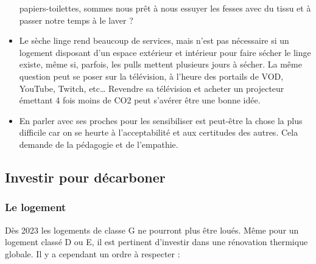 \begin{itemize}
  papiers-toilettes, sommes nous prêt à nous essuyer les fesses avec du
  tissu et à passer notre temps à le laver ?\\
\item
  Le sèche linge rend beaucoup de services, mais n'est pas nécessaire si
  un logement disposant d'un espace extérieur et intérieur pour faire
  sécher le linge existe, même si, parfois, les pulls mettent plusieurs
  jours à sécher. La même question peut se poser sur la télévision, à
  l'heure des portails de VOD, YouTube, Twitch, etc\ldots{} Revendre sa
  télévision et acheter un projecteur émettant 4 fois moins de CO2 peut
  s'avérer être une bonne idée.\\
\item
  En parler avec ses proches pour les sensibiliser est peut-être la
  chose la plus difficile car on se heurte à l'acceptabilité et aux
  certitudes des autres. Cela demande de la pédagogie et de l'empathie.
\end{itemize}

\hypertarget{investir-pour-duxe9carboner}{%
\subsection{Investir pour
décarboner}\label{investir-pour-duxe9carboner}}

\hypertarget{le-logement}{%
\subsubsection{Le logement}\label{le-logement}}

Dès 2023 les logements de classe G ne pourront plus être loués. Même
pour un logement classé D ou E, il est pertinent d'investir dans une
rénovation thermique globale. Il y a cependant un ordre à respecter :

